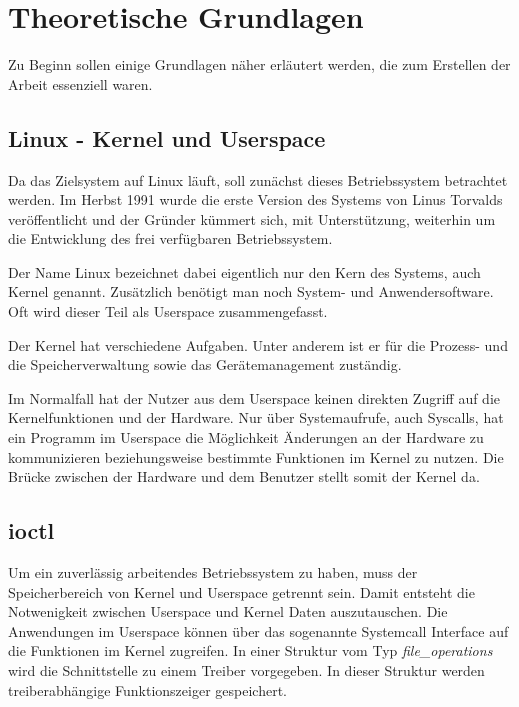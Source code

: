\chapter{Theoretische Grundlagen} \label{sec:grund}
Zu Beginn sollen einige Grundlagen näher erläutert werden, die zum Erstellen der Arbeit essenziell waren.

\section{Linux - Kernel und Userspace}\label{sec:linux}
Da das Zielsystem auf Linux läuft, soll zunächst dieses Betriebssystem betrachtet werden. 
Im Herbst 1991 wurde die erste Version des Systems von Linus Torvalds veröffentlicht und der Gründer kümmert sich, mit Unterstützung, weiterhin um die Entwicklung des frei verfügbaren Betriebssystem.
 
Der Name Linux bezeichnet dabei eigentlich nur den Kern des Systems, auch Kernel genannt. Zusätzlich benötigt man noch System- und Anwendersoftware. Oft wird dieser Teil als Userspace zusammengefasst. \citep[S. 46]{plotner2012linux} 

Der Kernel hat verschiedene Aufgaben. Unter anderem ist er für die Prozess- und die Speicherverwaltung sowie das Gerätemanagement zuständig. \citep[S. 234]{schroder2009embedded} 

Im Normalfall hat der Nutzer aus dem Userspace keinen direkten Zugriff auf die Kernelfunktionen und der Hardware. Nur über Systemaufrufe, auch Syscalls, hat ein Programm im Userspace die Möglichkeit Änderungen an der Hardware zu kommunizieren beziehungsweise bestimmte Funktionen im Kernel zu nutzen. \citep[S. 124]{plotner2012linux} 
Die Brücke zwischen der Hardware und dem Benutzer stellt somit der Kernel da.


\section{\acl{ioctl}}\label{sec:ioctl_t}
Um ein zuverlässig arbeitendes Betriebssystem zu haben, muss der Speicherbereich von Kernel und Userspace getrennt sein. \citep[S. 232]{schroder2009embedded}
Damit entsteht die Notwenigkeit zwischen Userspace und Kernel Daten auszutauschen. Die Anwendungen im Userspace können über das sogenannte Systemcall Interface auf die Funktionen im Kernel zugreifen. In einer Struktur vom Typ \textit{file\_operations} wird die Schnittstelle zu einem Treiber vorgegeben. In dieser Struktur werden treiberabhängige Funktionszeiger gespeichert. \citep[S. 249]{schroder2009embedded}

